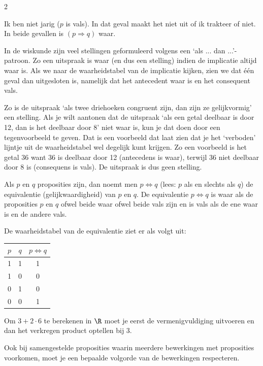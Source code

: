\begin{multicols}{2}
\begin{opsomming}
\item Ik ben niet jarig ($p$ is vals). In dat geval maakt het niet uit of ik trakteer of niet. In beide gevallen is $(p\Rightarrow q)$ waar.
\end{opsomming}

In de wiskunde zijn veel stellingen geformuleerd volgens een `als ... dan ...'-patroon. Zo een uitspraak is waar (en dus een stelling) indien de implicatie altijd waar is. Als we naar de waarheidstabel van de implicatie kijken, zien we dat één geval dan uitgesloten is, namelijk dat het antecedent waar is en het consequent vals. 

Zo is de uitspraak `als twee driehoeken congruent zijn, dan zijn ze gelijkvormig' een stelling. Als je wilt aantonen dat de uitspraak `als een getal deelbaar is door 12, dan is het deelbaar door 8' niet waar is, kun je dat doen door een tegenvoorbeeld te geven. Dat is een voorbeeld dat laat zien dat je het `verboden' lijntje uit de waarheidstabel wel degelijk kunt krijgen. Zo een voorbeeld is het getal 36 want 36 is deelbaar door 12 (antecedens is waar), terwijl 36 niet deelbaar door 8 is (consequens is vals). De uitspraak is dus geen stelling.  


Als $p$ en $q$ proposities zijn, dan noemt men $p \Leftrightarrow q$ (lees: $p$ als en slechts als $q$) de equivalentie (gelijkwaardigheid) van $p$ en $q$. De equivalentie $p\Leftrightarrow q$ is waar als de proposities $p$ en $q$ ofwel beide waar ofwel beide vals zijn en is vals als de ene waar is en de andere vals. 

De waarheidstabel van de equivalentie ziet er als volgt uit:
\begin{center}
\begin{tabular}{c|c|c}  
$p$ & $q$ & $p\Leftrightarrow q$\\
\hline
1 & 1 & 1 \\
1 & 0 & 0\\
0 & 1 & 0\\
0 & 0 & 1
\end{tabular}
\end{center}



Om $3+2\cdot 6$ te berekenen in $\R$ moet je eerst de vermenigvuldiging uitvoeren en dan het verkregen product optellen bij 3.

Ook bij samengestelde proposities waarin meerdere bewerkingen met proposities voorkomen, moet je een bepaalde volgorde van de bewerkingen respecteren. 


\end{multicols}
